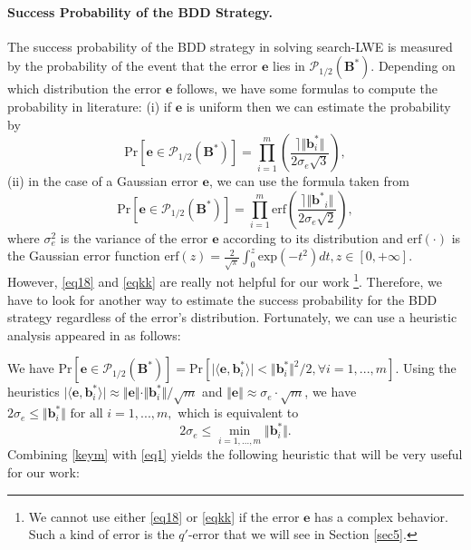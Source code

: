 \documentclass[runningheads]{llncs}
\begin{document}
\paragraph{Success Probability of  the BDD Strategy.} 
The success probability of the BDD strategy in solving search-LWE is measured by the probability of the event that the error $\mathbf{e}$ lies in $\mathcal{P}_{1/2}(\mathbf{B^*})$.
Depending on which distribution the error $\mathbf{e}$ follows, we have some formulas to compute the probability in literature: (i) if $\mathbf{e}$ is uniform then we can estimate the probability by
 \begin{equation}\label{eq18}
  \mathrm{Pr}\left[ \mathbf{e} \in \mathcal{P}_{1/2}(\mathbf{B^*})\right]= \prod_{i=1}^{m}\left(  \frac{ \rceil \Vert\mathbf{b}^{*}_i \Vert}{2\sigma_e\sqrt{3}} \right), 
 \end{equation}
(ii) in the case of a Gaussian error $\mathbf{e}$, we can use the formula taken from \cite{LP11}
 \begin{equation}\label{eqkk}
 \mathrm{Pr}\left[ \mathbf{e} \in \mathcal{P}_{1/2}(\mathbf{B^*})\right]=\prod_{i=1}^{m}\mathrm{erf}\left( \frac{ \rceil \Vert \mathbf{b^{*}}_i \Vert}{2 \sigma_e \sqrt{2}} \right),
 \end{equation} 
 where $\sigma^2_e $ is the variance of the error $\mathbf{e}$ according to its distribution and $\mathrm{erf}(\cdot)$ is the Gaussian error function 
 $\mathrm{erf}(z)=\frac{2}{\sqrt{\pi}}\int_{0}^{z} \text{exp}(-t^2)dt, z \in [0, +\infty].$
However, \eqref{eq18} and \eqref{eqkk} are really not helpful for our work \footnote[2]{We cannot use either \eqref{eq18} or \eqref{eqkk} if the error $\mathbf{e}$ has a complex behavior. Such a kind of error is the $q'$-error that we will see in Section \ref{sec5}.}. Therefore, we have to look for another way to estimate the success probability for the BDD strategy regardless of the error's distribution. Fortunately, we can use a heuristic analysis appeared in \cite{KYGY16} as follows:

We have $\mathrm{Pr}\left[ \mathbf{e} \in \mathcal{P}_{1/2}(\mathbf{B^*})\right]=\mathrm{Pr}\left[\vert \langle \mathbf{e}, \mathbf{b}_i^{*} \rangle \vert < \Vert \mathbf{b}_i^{*} \Vert^2/2, \forall i=1,...,m\right].$ Using the heuristics
$\vert \langle \mathbf{e}, \mathbf{b}_i^{*} \rangle \vert  \approx \Vert \mathbf{e} \Vert \cdot \Vert \mathbf{b}_i^{*} \Vert /\sqrt{m}$ and  $\Vert \mathbf{e} \Vert \approx \sigma_e \cdot \sqrt{m}$, we have  $2 \sigma_e \leq \Vert \mathbf{b}_i^{*} \Vert \text{ for all } i=1,...,m,$ which is equivalent to 
\begin{equation}\label{keym}
2 \sigma_e \leq \min_{i=1,...,m}\Vert \mathbf{b}_i^* \Vert.
\end{equation}
Combining \eqref{keym} with \eqref{eq1} yields the following heuristic that will be very useful for our work:
\end{document}
